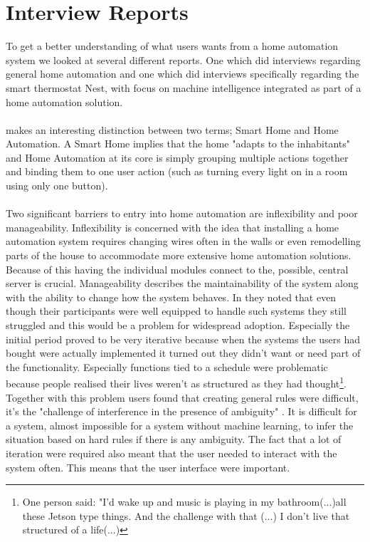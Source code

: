 \section{Interview Reports}
To get a better understanding of what users wants from a home automation system we looked at several different reports. One \cite{HAInterviews} which did interviews regarding general home automation and one \cite{AdaptiveInterviews} which did interviews specifically regarding the smart thermostat Nest, with focus on machine intelligence integrated as part of a home automation solution. 
\\\\
\cite{HAInterviews} makes an interesting distinction between two terms; Smart Home and Home Automation. A Smart Home implies that the home "adapts to the inhabitants" and Home Automation at its core is simply grouping multiple actions together and binding them to one user action (such as turning every light on in a room using only one button).
\\\\
Two significant barriers to entry into home automation are inflexibility and poor manageability\cite{HAInterviews}. Inflexibility is concerned with the idea that installing a home automation system requires changing wires often in the walls or even remodelling parts of the house to accommodate more extensive home automation solutions.  Because of this having the individual modules connect to the, possible, central server is crucial.
Manageability describes the maintainability of the system along with the ability to change how the system behaves. In \cite{HAInterviews} they noted that even though their participants were well equipped to handle such systems they still struggled and this would be a problem for widespread adoption. Especially the initial period proved to be very iterative because when the systems the users had bought were actually implemented it turned out they didn't want or need part of the functionality. Especially functions tied to a schedule were problematic because people realised their lives weren't as structured as they had thought\footnote{One person said: "I'd wake up and music is playing in my bathroom(...)all these Jetson type things. And the challenge with that (...) I don't live that structured of a life(...)}. Together with this problem users found that creating general rules were difficult, it's the "challenge of interference in the presence of ambiguity" \cite{HAInterviews}. It is difficult for a system, almost impossible for a system without machine learning, to infer the situation based on hard rules if there is any ambiguity. The fact that a lot of iteration were required also meant that the user needed to interact with the system often. This means that the user interface were important.
